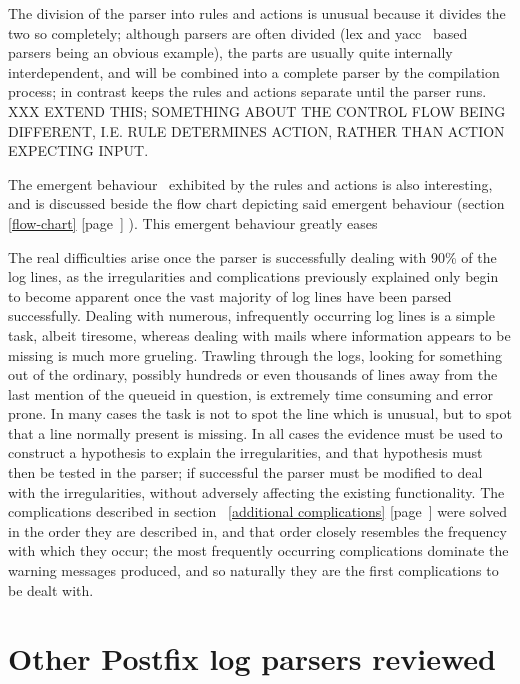 \documentclass[a4paper,12pt,draft]{article}
\newcommand{\parsername}{\PLP{}}
\newcommand{\refwithpage}[1]{%
    \empty{}\ref{#1} [page~\pageref{#1}]%
}
\begin{document}
The division of the parser into rules and actions is unusual because it
divides the two so completely; although parsers are often divided (lex and
yacc~\cite{lex-and-yacc} based parsers being an obvious example), the parts
are usually quite internally interdependent, and will be combined into a
complete parser by the compilation process; in contrast \parsername{} keeps
the rules and actions separate until the parser runs.  XXX EXTEND THIS\@;
SOMETHING ABOUT THE CONTROL FLOW BEING DIFFERENT, I.E. RULE DETERMINES
ACTION, RATHER THAN ACTION EXPECTING INPUT\@.


The emergent behaviour~\cite{Wikipedia-Emergence} exhibited by the rules
and actions is also interesting, and is discussed beside the flow chart
depicting said emergent behaviour (section~\refwithpage{flow-chart}).  This
emergent behaviour greatly eases 


The real difficulties arise once the parser is successfully dealing with
90\% of the log lines, as the irregularities and complications previously
explained only begin to become apparent once the vast majority of log lines
have been parsed successfully.  Dealing with numerous, infrequently
occurring log lines is a simple task, albeit tiresome, whereas dealing with
mails where information appears to be missing is much more grueling.
Trawling through the logs, looking for something out of the ordinary,
possibly hundreds or even thousands of lines away from the last mention of
the queueid in question, is extremely time consuming and error prone.  In
many cases the task is not to spot the line which is unusual, but to spot
that a line normally present is missing.  In all cases the evidence must be
used to construct a hypothesis to explain the irregularities, and that
hypothesis must then be tested in the parser; if successful the parser must
be modified to deal with the irregularities, without adversely affecting
the existing functionality.  The complications described in
section~\refwithpage{additional complications} were solved in the order
they are described in, and that order closely resembles the frequency with
which they occur; the most frequently occurring complications dominate the
warning messages produced, and so naturally they are the first
complications to be dealt with.

\appendix


\section{Other Postfix log parsers reviewed}
\end{document}
